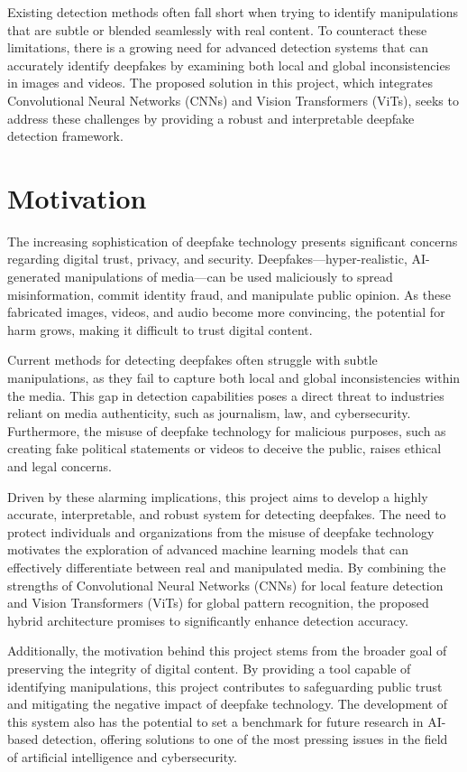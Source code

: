 \noindent Existing detection methods often fall short when trying to identify manipulations that are subtle or blended seamlessly with real content. To counteract these limitations, there is a growing need for advanced detection systems that can accurately identify deepfakes by examining both local and global inconsistencies in images and videos. The proposed solution in this project, which integrates Convolutional Neural Networks (CNNs) and Vision Transformers (ViTs), seeks to address these challenges by providing a robust and interpretable deepfake detection framework. 

\section{Motivation}
The increasing sophistication of deepfake technology presents significant concerns regarding digital trust, privacy, and security. Deepfakes—hyper-realistic, AI-generated manipulations of media—can be used maliciously to spread misinformation, commit identity fraud, and manipulate public opinion. As these fabricated images, videos, and audio become more convincing, the potential for harm grows, making it difficult to trust digital content.

\noindent Current methods for detecting deepfakes often struggle with subtle manipulations, as they fail to capture both local and global inconsistencies within the media. This gap in detection capabilities poses a direct threat to industries reliant on media authenticity, such as journalism, law, and cybersecurity. Furthermore, the misuse of deepfake technology for malicious purposes, such as creating fake political statements or videos to deceive the public, raises ethical and legal concerns.

\noindent Driven by these alarming implications, this project aims to develop a highly accurate, interpretable, and robust system for detecting deepfakes. The need to protect individuals and organizations from the misuse of deepfake technology motivates the exploration of advanced machine learning models that can effectively differentiate between real and manipulated media. By combining the strengths of Convolutional Neural Networks (CNNs) for local feature detection and Vision Transformers (ViTs) for global pattern recognition, the proposed hybrid architecture promises to significantly enhance detection accuracy.

\noindent Additionally, the motivation behind this project stems from the broader goal of preserving the integrity of digital content. By providing a tool capable of identifying manipulations, this project contributes to safeguarding public trust and mitigating the negative impact of deepfake technology. The development of this system also has the potential to set a benchmark for future research in AI-based detection, offering solutions to one of the most pressing issues in the field of artificial intelligence and cybersecurity.


